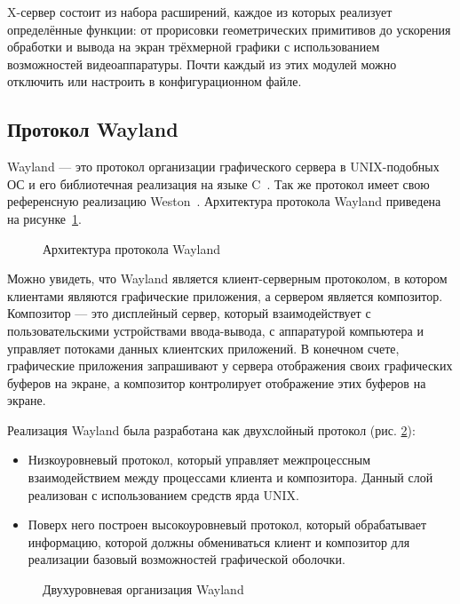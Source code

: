 X-сервер состоит из набора расширений, каждое из которых реализует определённые функции: от прорисовки геометрических примитивов до ускорения обработки и вывода на экран трёхмерной графики с использованием возможностей видеоаппаратуры. Почти каждый из этих модулей можно отключить или настроить в конфигурационном файле.

\subsection{Протокол Wayland}
Wayland --- это протокол организации графического сервера в UNIX-подобных ОС и его библиотечная реализация на языке C~\cite{Wayland}. Так же протокол имеет свою референсную реализацию Weston~\cite{Weston}. Архитектура протокола Wayland приведена на рисунке~\ref{fig:waylandArchitechture}.

\begin{figure}[h!]
\caption{Архитектура протокола Wayland}
\label{fig:waylandArchitechture}
\end{figure}

Можно увидеть, что Wayland является клиент-серверным протоколом, в котором клиентами являются графические приложения, а сервером является композитор. Композитор --- это дисплейный сервер, который взаимодействует с пользовательскими устройствами ввода-вывода, с аппаратурой компьютера и управляет потоками данных клиентских приложений. В конечном счете, графические приложения запрашивают у сервера отображения своих графических буферов на экране, а композитор контролирует отображение этих буферов на экране. 

Реализация Wayland была разработана как двухслойный протокол (рис. \ref{fig:waylandClientServer}):
\begin{itemize}
\item Низкоуровневый протокол, который управляет межпроцессным взаимодействием между процессами клиента и композитора. Данный слой реализован с использованием средств ярда UNIX.
\item Поверх него построен высокоуровневый протокол, который обрабатывает информацию, которой должны обмениваться клиент и композитор для реализации базовый возможностей графической оболочки. 
\end{itemize}
\begin{figure}[h!]
\caption{Двухуровневая организация Wayland}
\label{fig:waylandClientServer}
\end{figure}

